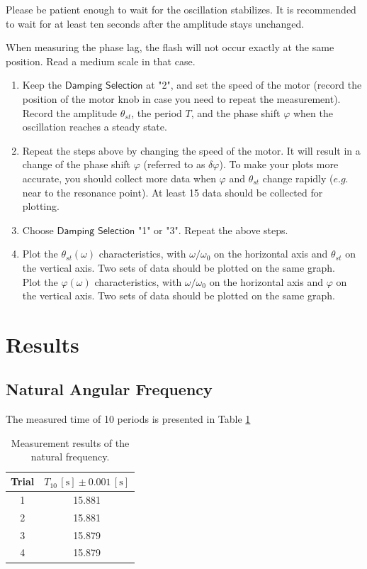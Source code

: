 \documentclass[a4paper]{article}
\begin{document}
Please be patient enough to wait for the oscillation stabilizes. It is recommended to wait for at least ten seconds after the amplitude stays unchanged.

When measuring the phase lag, the flash will not occur exactly at the same position. Read a medium scale in that case.
\begin{enumerate}
\item Keep the $\textsf{Damping Selection}$ at "2", and set the speed of the motor (record the position of the motor knob in case you need to repeat the measurement). Record the amplitude $\theta_{st}$, the period $T$, and the phase shift $\varphi$ when the oscillation reaches a steady state.
\item Repeat the steps above by changing the speed of the motor. It will result in a change of the phase shift $\varphi$ (referred to as $\delta\varphi$). To make your plots more accurate, you should collect more data when $\varphi$ and $\theta_{st}$ change rapidly ($e.g.$ near to the resonance point). At least 15 data should be collected for plotting.
\item Choose $\textsf{Damping Selection}$ "1" or "3". Repeat the above steps.
\item Plot the $\theta_{st}(\omega)$ characteristics, with $\omega/\omega_0$ on the horizontal axis and $\theta_{st}$ on the vertical axis. Two sets of data should be plotted on the same graph.
\\Plot the $\varphi(\omega)$ characteristics, with $\omega/\omega_0$ on the horizontal axis and $\varphi$ on the vertical axis. Two sets of data should be plotted on the same graph.

\end{enumerate}



\section{Results}

\subsection{Natural Angular Frequency}

The measured time of 10 periods is presented in Table \ref{Tab:naturalfrequency}

\begin{table}[htbp]
\centering
\begin{tabular}{cc}
\toprule
Trial & $T_{10}\,[\text{s}] \pm 0.001\,[\text{s}]$ \\
\midrule
1 & 15.881\\
2 & 15.881\\
3 & 15.879\\
4 & 15.879\\
\bottomrule
\end{tabular}
\caption{Measurement results of the natural frequency.}\label{Tab:naturalfrequency}
\end{table}
\end{document}
